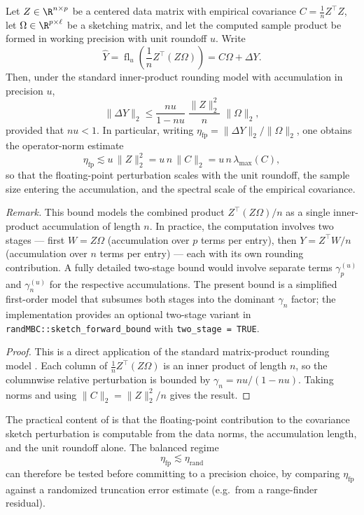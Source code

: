 \begin{proposition}
	\label{prop:cov_sketch_perturbation}
	Let \(Z \in \R^{n \times p}\) be a centered data matrix with empirical
	covariance \(C = \frac{1}{n}Z^\top Z\), let
	\(\Omega \in \R^{p \times \ell}\) be a sketching matrix, and let the
	computed sample product be formed in working precision with unit roundoff
	\(u\). Write
	\[
		\widehat Y
		= \operatorname{fl}_u\!\left(\frac{1}{n}Z^\top(Z\Omega)\right)
		= C\Omega + \Delta Y.
	\]
	Then, under the standard inner-product rounding model with accumulation
	in precision \(u\),
	\[
		\|\Delta Y\|_2
		\le
		\frac{n u}{1 - n u}\;\frac{\|Z\|_2^2}{n}\;\|\Omega\|_2,
	\]
	provided that \(n u < 1\). In particular, writing
	\(\eta_{\mathrm{fp}} = \|\Delta Y\|_2 / \|\Omega\|_2\), one obtains
	the operator-norm estimate
	\[
		\eta_{\mathrm{fp}}
		\lesssim
		u\,\|Z\|_2^2
		=
		u\,n\,\|C\|_2
		=
		u\,n\,\lambda_{\max}(C),
	\]
	so that the floating-point perturbation scales with the unit roundoff, the
	sample size entering the accumulation, and the spectral scale of the
	empirical covariance.

	\medskip
	\noindent\textit{Remark.} This bound models the combined product
	\(Z^\top(Z\Omega)/n\) as a single inner-product accumulation of length
	\(n\). In practice, the computation involves two stages --- first
	\(W = Z\Omega\) (accumulation over \(p\) terms per entry), then
	\(Y = Z^\top W/n\) (accumulation over \(n\) terms per entry) --- each with
	its own rounding contribution. A fully detailed two-stage bound would
	involve separate terms \(\gamma_p^{(u)}\) and \(\gamma_n^{(u)}\) for the
	respective accumulations. The present bound is a simplified first-order
	model that subsumes both stages into the dominant \(\gamma_n\) factor; the
	implementation provides an optional two-stage variant in
	\texttt{randMBC::sketch\_forward\_bound} with \texttt{two\_stage = TRUE}.
\end{proposition}

\begin{proof}
	This is a direct application of the standard matrix-product rounding model
	\cite[Thm.~3.5]{higham2022mixed}. Each column of
	\(\frac{1}{n}Z^\top(Z\Omega)\) is an inner product of length \(n\),
	so the columnwise relative perturbation is bounded by \(\gamma_n = nu/(1-nu)\).
	Taking norms and using \(\|C\|_2 = \|Z\|_2^2/n\) gives the result.
\end{proof}

The practical content of  is that the floating-point contribution to the covariance sketch perturbation is computable from the data norms, the accumulation length, and the unit roundoff alone. The balanced regime
\[
	\eta_{\mathrm{fp}} \lesssim \eta_{\mathrm{rand}}
\]
can therefore be tested before committing to a precision choice, by comparing \(\eta_{\mathrm{fp}}\) against a randomized truncation error estimate (e.g.\ from a range-finder residual).

